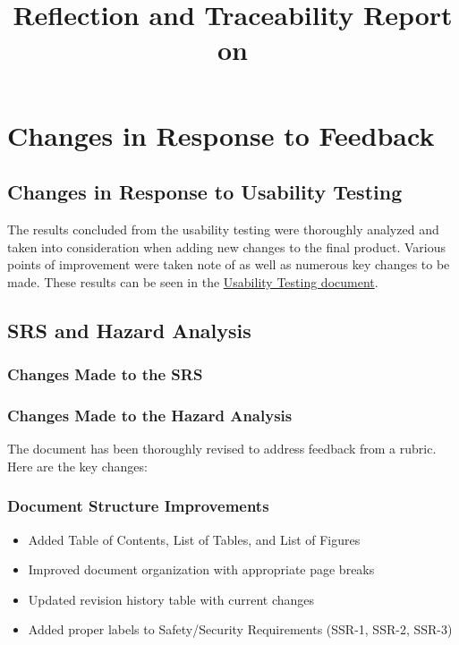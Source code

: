 \documentclass{article}
\title{Reflection and Traceability Report on \progname}
\author{\authname}
\date{}
\begin{document}
\maketitle


\section{Changes in Response to Feedback}

\subsection{Changes in Response to Usability Testing}
The results concluded from the usability testing were thoroughly analyzed and taken into consideration when adding new changes to the final product. Various points of improvement were taken note of as well as numerous key changes to be made. These results can be seen in the \href{docs/UsabilityTesting/UsabilityTesting.pdf}{Usability Testing document}.
\subsection{SRS and Hazard Analysis}

\subsubsection{Changes Made to the SRS}


\subsubsection{Changes Made to the Hazard Analysis}

The document has been thoroughly revised to address feedback from a rubric. Here are the key changes:

\subsubsection{Document Structure Improvements}
\begin{itemize}
  \item Added Table of Contents, List of Tables, and List of Figures
  \item Improved document organization with appropriate page breaks
  \item Updated revision history table with current changes
  \item Added proper labels to Safety/Security Requirements (SSR-1, SSR-2, SSR-3)
\end{itemize}
\end{document}

